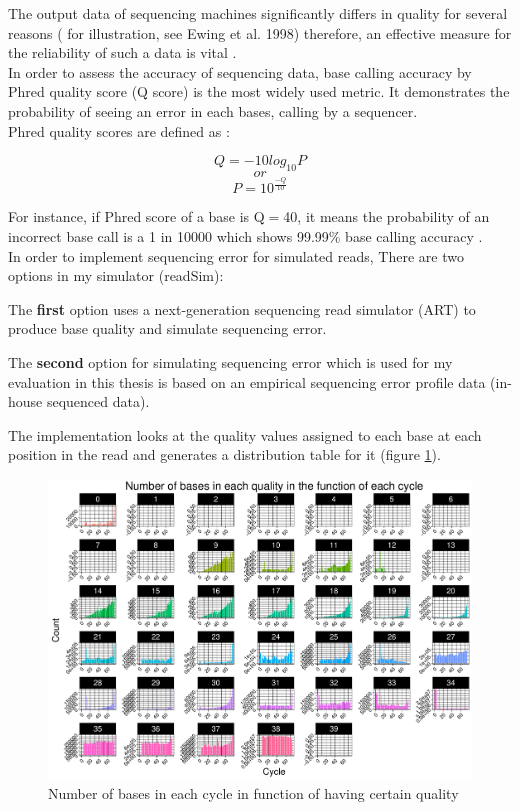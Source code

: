 \documentclass[11pt,a4paper]{report}
\begin{document}
The output data of sequencing machines significantly differs in quality for 
several reasons ( for illustration, see Ewing et al. 1998) therefore, an effective 
measure for the reliability of such a data is vital \cite{phred1}.\\

In order to assess the accuracy of sequencing data, base calling accuracy by Phred 
quality score (Q score) is the most widely used metric. It demonstrates the probability 
of seeing an error in each bases, calling by a sequencer.\\

Phred quality scores are defined as \cite{phred2}:

$$ Q = -10  log_{10}P   $$
$$  or $$
$$ P = 10 ^ { \frac{-Q}{ 10 } } $$

For instance, if Phred score of a base is Q$=$40, it means the probability of an 
incorrect base call is a 1 in 10000 which shows 99.99\% base calling accuracy 
\cite{IlluminaPhred}. \\  

In order to implement sequencing error for simulated reads, There are two
options in my simulator (readSim):

The \textbf{first} option uses a next-generation sequencing read simulator 
(ART) to produce base quality and simulate sequencing error.


The \textbf{second} option for simulating sequencing error which is used for
my evaluation in this thesis is based on an empirical sequencing error profile 
data (in-house sequenced data).

The implementation looks at the quality values assigned to each base at each
position in the read and generates a distribution table for it (figure \ref{hist}).

\begin{figure}[H]
\centering
\includegraphics[width=12cm]{pictures/Rplot_quality.pdf}
\caption{Number of bases in each cycle in function of having certain quality}
\label{hist}
\end{figure}
\end{document}
